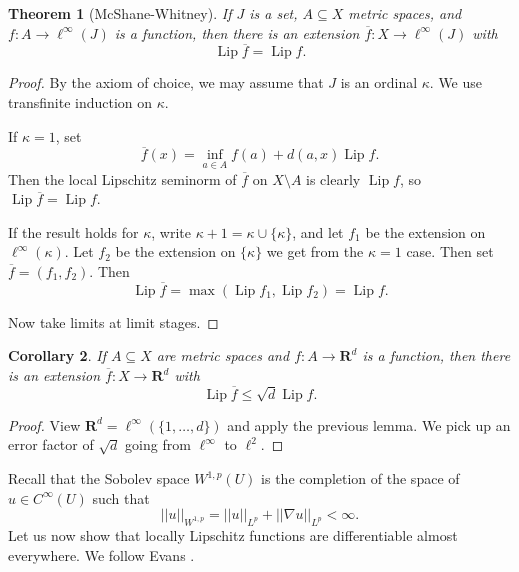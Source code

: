 \documentclass[reqno,12pt,letterpaper]{amsart}
\newcommand{\RR}{\mathbf{R}}
\DeclareMathOperator{\Lip}{Lip}
\newtheorem{theorem}{Theorem}[section]
\newtheorem{corollary}[theorem]{Corollary}
\theoremstyle{definition}
\numberwithin{equation}{section}
\begin{document}
\begin{theorem}[McShane-Whitney]
If $J$ is a set, $A \subseteq X$ metric spaces, and $f: A \to \ell^\infty(J)$ is a function, then there is an extension $\overline f: X \to \ell^\infty(J)$ with
$$\Lip \overline f = \Lip f.$$
\end{theorem}
\begin{proof}
By the axiom of choice, we may assume that $J$ is an ordinal $\kappa$.
We use transfinite induction on $\kappa$.

If $\kappa = 1$, set
$$\overline f(x) = \inf_{a \in A} f(a) + d(a, x) \Lip f.$$
Then the local Lipschitz seminorm of $\overline f$ on $X \setminus A$ is clearly $\Lip f$, so $\Lip \overline f = \Lip f$.

If the result holds for $\kappa$, write $\kappa + 1 = \kappa \cup \{\kappa\}$, and let $f_1$ be the extension on $\ell^\infty(\kappa)$.
Let $f_2$ be the extension on $\{\kappa\}$ we get from the $\kappa = 1$ case.
Then set $\overline f = (f_1, f_2)$. Then
$$\Lip \overline f = \max(\Lip f_1, \Lip f_2) = \Lip f.$$

Now take limits at limit stages.
\end{proof}

\begin{corollary}
If $A \subseteq X$ are metric spaces and $f: A \to \RR^d$ is a function, then there is an extension $\overline f: X \to \RR^d$ with
$$\Lip \overline f \leq \sqrt d \Lip f.$$
\end{corollary}
\begin{proof}
View $\RR^d = \ell^\infty(\{1, \dots, d\})$ and apply the previous lemma. We pick up an error factor of $\sqrt d$ going from $\ell^\infty$ to $\ell^2$.
\end{proof}

Recall that the Sobolev space $W^{1,p}(U)$ is the completion of the space of $u \in C^\infty(U)$ such that
$$||u||_{W^{1, p}} = ||u||_{L^p} + ||\nabla u||_{L^p} < \infty.$$
Let us now show that locally Lipschitz functions are differentiable almost everywhere.
We follow Evans \cite{evans2010partial}.
\end{document}
